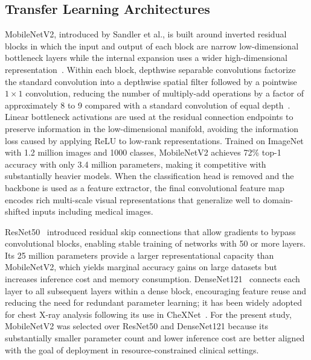 \documentclass[preprint,12pt]{elsarticle}
\begin{document}
\subsection{Transfer Learning Architectures}
MobileNetV2, introduced by Sandler et al., is built around inverted
residual blocks in which the input and output of each block are
narrow low-dimensional bottleneck layers while the internal expansion
uses a wider high-dimensional representation~\cite{mobilenetv2}.
Within each block, depthwise separable convolutions factorize the
standard convolution into a depthwise spatial filter followed by a
pointwise $1 \times 1$ convolution, reducing the number of multiply-add
operations by a factor of approximately 8 to 9 compared with a
standard convolution of equal depth~\cite{mobilenetv2}.
Linear bottleneck activations are used at the residual connection
endpoints to preserve information in the low-dimensional manifold,
avoiding the information loss caused by applying ReLU to low-rank
representations.
Trained on ImageNet with 1.2 million images and 1000 classes,
MobileNetV2 achieves 72\% top-1 accuracy with only 3.4 million
parameters, making it competitive with substantially heavier models.
When the classification head is removed and the backbone is used as a
feature extractor, the final convolutional feature map encodes rich
multi-scale visual representations that generalize well to domain-
shifted inputs including medical images.

ResNet50~\cite{he2016resnet} introduced residual skip connections that
allow gradients to bypass convolutional blocks, enabling stable
training of networks with 50 or more layers.
Its 25 million parameters provide a larger representational capacity
than MobileNetV2, which yields marginal accuracy gains on large
datasets but increases inference cost and memory consumption.
DenseNet121~\cite{huang2017densenet} connects each layer to all
subsequent layers within a dense block, encouraging feature reuse and
reducing the need for redundant parameter learning; it has been widely
adopted for chest X-ray analysis following its use in CheXNet~\cite{rajpurkar2017chexnet}.
For the present study, MobileNetV2 was selected over ResNet50 and
DenseNet121 because its substantially smaller parameter count and
lower inference cost are better aligned with the goal of deployment
in resource-constrained clinical settings.

\end{document}
